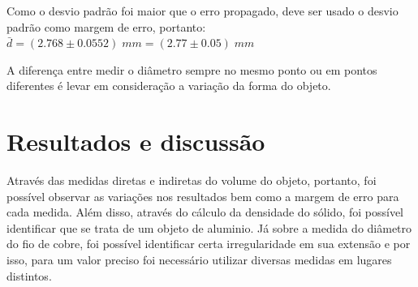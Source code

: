 \documentclass{article}
\begin{document}
Como o desvio padrão foi maior que o erro propagado, deve ser usado o desvio padrão como margem de erro, portanto: $\bar{d} = (2.768 \pm 0.0552)\;mm = (2.77 \pm 0.05)\;mm$

A diferença entre medir o diâmetro sempre no mesmo ponto ou em pontos diferentes é levar em consideração a variação da forma do objeto.

\section{Resultados e discussão}

\indent

Através das medidas diretas e indiretas do volume do objeto, portanto, foi possível observar as variações nos resultados bem como a margem de erro para cada medida. Além disso, através do cálculo da densidade do sólido, foi possível identificar que se trata de um objeto de aluminio. Já sobre a medida do diâmetro do fio de cobre, foi possível identificar certa irregularidade em sua extensão e por isso, para um valor preciso foi necessário utilizar diversas medidas em lugares distintos.
\end{document}

